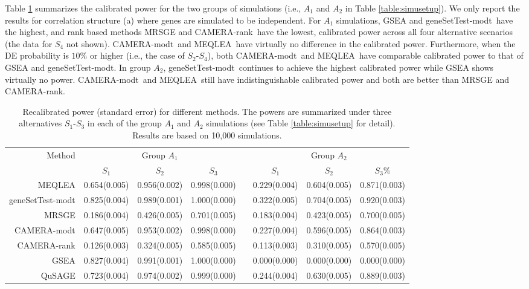 \documentclass[useAMS,usenatbib, galley]{biom}
\newcommand{\OurMethod}{MEQLEA}
\newcommand{\aaCase}{a}
\newcommand{\CMR}{CAMERA-rank}
\newcommand{\CMT}{CAMERA-modt}
\newcommand{\gent}{geneSetTest-modt}
\begin{document}
	Table \ref{table:power} summarizes the calibrated power for the two groups of simulations (i.e., $A_1$ and $A_2$ in Table \ref{table:simusetup}). We only report the results for correlation structure (\aaCase) where genes are simulated to be independent. %
	For $A_1$ simulations, GSEA and \gent~have the highest, and rank based methods MRSGE and \CMR~have the lowest, calibrated power across all four alternative scenarios (the data for $S_4$ not shown). \CMT~and \OurMethod~have virtually no difference in the calibrated power. Furthermore, when the DE probability is $10\%$ or higher (i.e., the case of  $S_2$-$S_4$), both \CMT~and \OurMethod~have comparable calibrated power to that of GSEA and \gent. In group $A_2$, \gent~continues to achieve the highest calibrated power while GSEA shows virtually no power. \CMT~and \OurMethod~still have indistinguishable calibrated power and both are better than MRSGE and \CMR.
	

	
\begin{table*}
	\centering
	\caption{Recalibrated power (standard error) for different methods. The powers are summarized under three alternatives $S_1$-$S_3$ in each of the group $A_1$ and $A_2$ simulations (see Table \ref{table:simusetup} for detail). Results are based on 10,000 simulations. }\label{table:power}
	\begin{tabular}{rccc c ccc}
		\hline\hline
		Method	& \multicolumn{3}{c}{Group $A_1$} &  & \multicolumn{3}{c}{Group $A_2$} \\
		\cline{2-4}   \cline{6-8}
		& $S_1$ & $S_2$ & $S_3$	 & & $S_1$ & $S_2$ & $S_3$\% \\
		\cline{2-4}   \cline{6-8}
		\OurMethod & 0.654(0.005) & 0.956(0.002) & 0.998(0.000) & & 0.229(0.004) & 0.604(0.005) & 0.871(0.003)\\ 
		\gent & 0.825(0.004) & 0.989(0.001) & 1.000(0.000) & &0.322(0.005) & 0.704(0.005) & 0.920(0.003) \\
		MRSGE & 0.186(0.004) & 0.426(0.005) & 0.701(0.005)& & 0.183(0.004) & 0.423(0.005) & 0.700(0.005) \\ 
		\CMT & 0.647(0.005) & 0.953(0.002) & 0.998(0.000)& & 0.227(0.004) & 0.596(0.005) & 0.864(0.003)  \\ 
		\CMR & 0.126(0.003) & 0.324(0.005) & 0.585(0.005) & &0.113(0.003) & 0.310(0.005) & 0.570(0.005) \\
		GSEA & 0.827(0.004) & 0.991(0.001) & 1.000(0.000) & & 0.000(0.000) & 0.000(0.000) & 0.000(0.000) \\ 
		QuSAGE & 0.723(0.004) & 0.974(0.002) & 0.999(0.000) & &  0.244(0.004) & 0.630(0.005) & 0.889(0.003) \\ 
		\hline\hline
	\end{tabular}
\end{table*}
\end{document}
